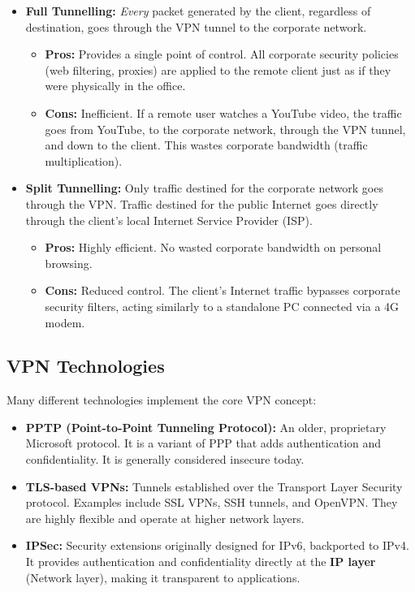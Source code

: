 \begin{itemize}
    \item \textbf{Full Tunnelling:} \textit{Every} packet generated by the client, regardless of destination, goes through the VPN tunnel to the corporate network.
    \begin{itemize}
        \item \textbf{Pros:} Provides a single point of control. All corporate security policies (web filtering, proxies) are applied to the remote client just as if they were physically in the office.
        \item \textbf{Cons:} Inefficient. If a remote user watches a YouTube video, the traffic goes from YouTube, to the corporate network, through the VPN tunnel, and down to the client. This wastes corporate bandwidth (traffic multiplication).
    \end{itemize}
    \item \textbf{Split Tunnelling:} Only traffic destined for the corporate network goes through the VPN. Traffic destined for the public Internet goes directly through the client's local Internet Service Provider (ISP).
    \begin{itemize}
        \item \textbf{Pros:} Highly efficient. No wasted corporate bandwidth on personal browsing.
        \item \textbf{Cons:} Reduced control. The client's Internet traffic bypasses corporate security filters, acting similarly to a standalone PC connected via a 4G modem.
    \end{itemize}
\end{itemize}

\subsection{VPN Technologies}

Many different technologies implement the core VPN concept:
\begin{itemize}
    \item \textbf{PPTP (Point-to-Point Tunneling Protocol):} An older, proprietary Microsoft protocol. It is a variant of PPP that adds authentication and confidentiality. It is generally considered insecure today.
    \item \textbf{TLS-based VPNs:} Tunnels established over the Transport Layer Security protocol. Examples include SSL VPNs, SSH tunnels, and OpenVPN. They are highly flexible and operate at higher network layers.
    \item \textbf{IPSec:} Security extensions originally designed for IPv6, backported to IPv4. It provides authentication and confidentiality directly at the \textbf{IP layer} (Network layer), making it transparent to applications.
\end{itemize}

